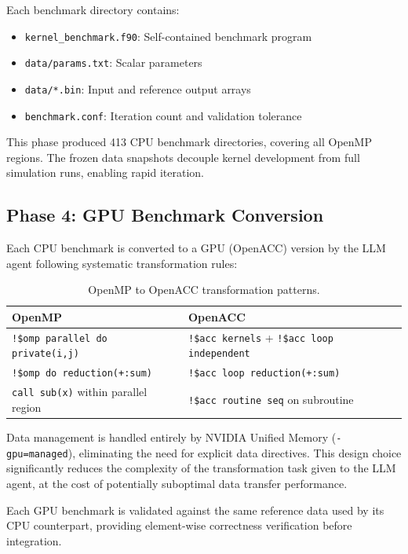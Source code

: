 \documentclass[conference]{IEEEtran}
\begin{document}
Each benchmark directory contains:
\begin{itemize}
\item \texttt{kernel\_benchmark.f90}: Self-contained benchmark program
\item \texttt{data/params.txt}: Scalar parameters
\item \texttt{data/*.bin}: Input and reference output arrays
\item \texttt{benchmark.conf}: Iteration count and validation tolerance
\end{itemize}

This phase produced 413 CPU benchmark directories, covering all OpenMP
regions. The frozen data snapshots decouple kernel development from full
simulation runs, enabling rapid iteration.

\subsection{Phase 4: GPU Benchmark Conversion}

Each CPU benchmark is converted to a GPU (OpenACC) version by the LLM agent
following systematic transformation rules:

\begin{table}[t]
\centering
\caption{OpenMP to OpenACC transformation patterns.}
\label{tab:transform}
\begin{tabular}{p{3.5cm}p{3.5cm}}
\toprule
OpenMP & OpenACC \\
\midrule
\texttt{!\$omp parallel do private(i,j)} &
\texttt{!\$acc kernels} + \texttt{!\$acc loop independent} \\
\texttt{!\$omp do reduction(+:sum)} &
\texttt{!\$acc loop reduction(+:sum)} \\
\texttt{call sub(x)} within parallel region &
\texttt{!\$acc routine seq} on subroutine \\
\bottomrule
\end{tabular}
\end{table}

Data management is handled entirely by NVIDIA Unified Memory
(\texttt{-gpu=managed}), eliminating the need for explicit data directives.
This design choice significantly reduces the complexity of the transformation
task given to the LLM agent, at the cost of potentially suboptimal data
transfer performance.

Each GPU benchmark is validated against the same reference data used by its
CPU counterpart, providing element-wise correctness verification before
integration.
\end{document}
